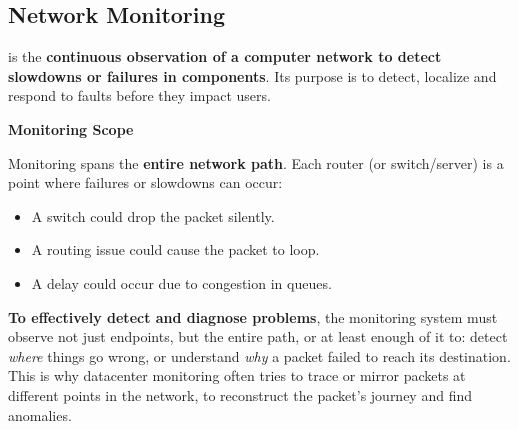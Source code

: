 \subsection{Network Monitoring}

 is the \textbf{continuous observation of a computer network to detect slowdowns or failures in components}. Its purpose is to detect, localize and respond to faults before they impact users.

\highspace
\begin{flushleft}
    \textcolor{Green3}{ \textbf{Monitoring Scope}}
\end{flushleft}
Monitoring spans the \textbf{entire network path}. Each router (or switch/server) is a point where failures or slowdowns can occur:
\begin{itemize}
    \item A switch could drop the packet silently.
    \item A routing issue could cause the packet to loop.
    \item A delay could occur due to congestion in queues.
\end{itemize}
\textbf{To effectively detect and diagnose problems}, the monitoring system must observe not just endpoints, but the entire path, or at least enough of it to: detect \emph{where} things go wrong, or understand \emph{why} a packet failed to reach its destination. This is why datacenter monitoring often tries to trace or mirror packets at different points in the network, to reconstruct the packet's journey and find anomalies.

